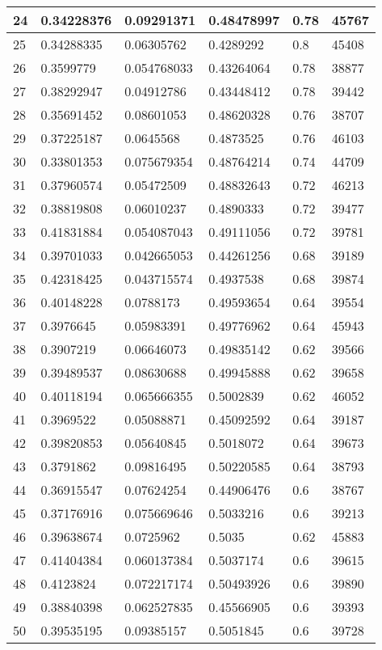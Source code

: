 \begin{longtable}{|l|l|l|l|l|l|}
24 & 0.34228376 & 0.09291371 & 0.48478997 & 0.78 & 45767 \\ \hline 
25 & 0.34288335 & 0.06305762 & 0.4289292 & 0.8 & 45408 \\ \hline 
26 & 0.3599779 & 0.054768033 & 0.43264064 & 0.78 & 38877 \\ \hline 
27 & 0.38292947 & 0.04912786 & 0.43448412 & 0.78 & 39442 \\ \hline 
28 & 0.35691452 & 0.08601053 & 0.48620328 & 0.76 & 38707 \\ \hline 
29 & 0.37225187 & 0.0645568 & 0.4873525 & 0.76 & 46103 \\ \hline 
30 & 0.33801353 & 0.075679354 & 0.48764214 & 0.74 & 44709 \\ \hline 
31 & 0.37960574 & 0.05472509 & 0.48832643 & 0.72 & 46213 \\ \hline 
32 & 0.38819808 & 0.06010237 & 0.4890333 & 0.72 & 39477 \\ \hline 
33 & 0.41831884 & 0.054087043 & 0.49111056 & 0.72 & 39781 \\ \hline 
34 & 0.39701033 & 0.042665053 & 0.44261256 & 0.68 & 39189 \\ \hline 
35 & 0.42318425 & 0.043715574 & 0.4937538 & 0.68 & 39874 \\ \hline 
36 & 0.40148228 & 0.0788173 & 0.49593654 & 0.64 & 39554 \\ \hline 
37 & 0.3976645 & 0.05983391 & 0.49776962 & 0.64 & 45943 \\ \hline 
38 & 0.3907219 & 0.06646073 & 0.49835142 & 0.62 & 39566 \\ \hline 
39 & 0.39489537 & 0.08630688 & 0.49945888 & 0.62 & 39658 \\ \hline 
40 & 0.40118194 & 0.065666355 & 0.5002839 & 0.62 & 46052 \\ \hline 
41 & 0.3969522 & 0.05088871 & 0.45092592 & 0.64 & 39187 \\ \hline 
42 & 0.39820853 & 0.05640845 & 0.5018072 & 0.64 & 39673 \\ \hline 
43 & 0.3791862 & 0.09816495 & 0.50220585 & 0.64 & 38793 \\ \hline 
44 & 0.36915547 & 0.07624254 & 0.44906476 & 0.6 & 38767 \\ \hline 
45 & 0.37176916 & 0.075669646 & 0.5033216 & 0.6 & 39213 \\ \hline 
46 & 0.39638674 & 0.0725962 & 0.5035 & 0.62 & 45883 \\ \hline 
47 & 0.41404384 & 0.060137384 & 0.5037174 & 0.6 & 39615 \\ \hline 
48 & 0.4123824 & 0.072217174 & 0.50493926 & 0.6 & 39890 \\ \hline 
49 & 0.38840398 & 0.062527835 & 0.45566905 & 0.6 & 39393 \\ \hline 
50 & 0.39535195 & 0.09385157 & 0.5051845 & 0.6 & 39728 \\ \hline 
\end{longtable}